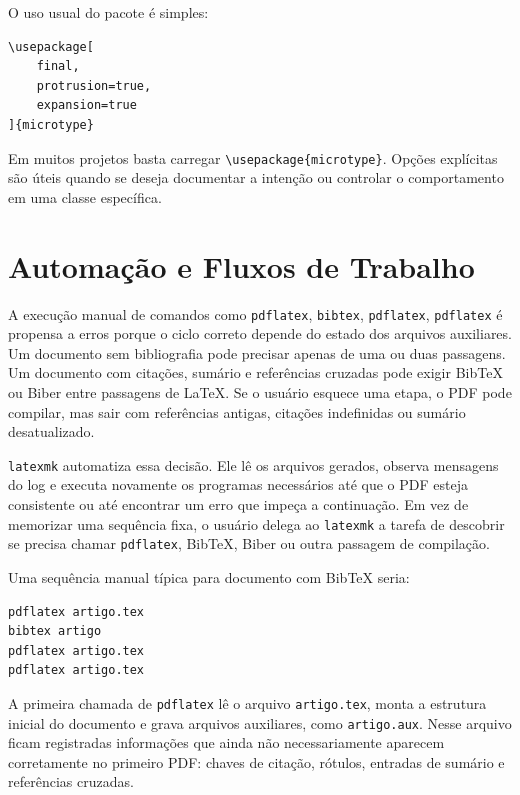 O uso usual do pacote é simples:

\begin{lstlisting}[language={[latex]TeX}, caption={Ativando microtipografia}]
\usepackage[
    final,
    protrusion=true,
    expansion=true
]{microtype}
\end{lstlisting}

Em muitos projetos basta carregar \verb|\usepackage{microtype}|. Opções explícitas são úteis quando se deseja documentar a intenção ou controlar o comportamento em uma classe específica.

\section{Automação e Fluxos de Trabalho}

A execução manual de comandos como \texttt{pdflatex}, \texttt{bibtex}, \texttt{pdflatex}, \texttt{pdflatex} é propensa a erros porque o ciclo correto depende do estado dos arquivos auxiliares. Um documento sem bibliografia pode precisar apenas de uma ou duas passagens. Um documento com citações, sumário e referências cruzadas pode exigir BibTeX ou Biber entre passagens de \LaTeX. Se o usuário esquece uma etapa, o PDF pode compilar, mas sair com referências antigas, citações indefinidas ou sumário desatualizado.

\texttt{latexmk} automatiza essa decisão. Ele lê os arquivos gerados, observa mensagens do log e executa novamente os programas necessários até que o PDF esteja consistente ou até encontrar um erro que impeça a continuação. Em vez de memorizar uma sequência fixa, o usuário delega ao \texttt{latexmk} a tarefa de descobrir se precisa chamar \texttt{pdflatex}, BibTeX, Biber ou outra passagem de compilação.

Uma sequência manual típica para documento com BibTeX seria:

\begin{lstlisting}[language=bash, caption={Ciclo manual com bibliografia}]
pdflatex artigo.tex
bibtex artigo
pdflatex artigo.tex
pdflatex artigo.tex
\end{lstlisting}

A primeira chamada de \texttt{pdflatex} lê o arquivo \texttt{artigo.tex}, monta a estrutura inicial do documento e grava arquivos auxiliares, como \texttt{artigo.aux}. Nesse arquivo ficam registradas informações que ainda não necessariamente aparecem corretamente no primeiro PDF: chaves de citação, rótulos, entradas de sumário e referências cruzadas.

